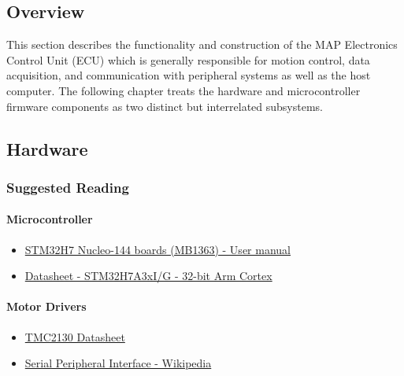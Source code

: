 \subsection{Overview}

This section describes the functionality and construction of the MAP Electronics Control Unit (ECU) which is generally responsible for motion control, data acquisition, and communication with peripheral systems as well as the host computer. The following chapter treats the hardware and microcontroller firmware components as two distinct but interrelated subsystems.



\subsection{Hardware}

\subsubsection{Suggested Reading}

\paragraph{Microcontroller}

\begin{itemize}

    \item \href{https://www.st.com/resource/en/user_manual/dm00499171-stm32h7-nucleo144-boards-mb1363-stmicroelectronics.pdf}{STM32H7 Nucleo-144 boards (MB1363) - User manual}
    
    \item \href{https://www.st.com/resource/en/datasheet/stm32h7a3ai.pdf}{Datasheet - STM32H7A3xI/G - 32-bit Arm Cortex}

\end{itemize} 

\paragraph{Motor Drivers}

\begin{itemize}
    
    \item \href{https://www.trinamic.com/fileadmin/assets/Products/ICs_Documents/TMC2130_datasheet.pdf}{TMC2130 Datasheet}
    
    \item \href{https://en.wikipedia.org/wiki/Serial_Peripheral_Interface}{Serial Peripheral Interface - Wikipedia}
    
\end{itemize}



